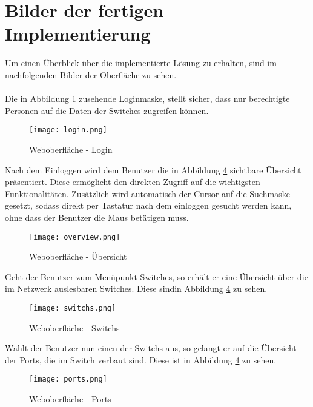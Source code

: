 \section*{Bilder der fertigen Implementierung}
\label{sec:impimgs}

Um einen Überblick über die implementierte Lösung zu erhalten, sind im nachfolgenden Bilder der Oberfläche zu sehen.\\\\
Die in Abbildung \ref{fig:login} zusehende Loginmaske, stellt sicher, dass nur berechtigte Personen auf die Daten der Switches zugreifen können.


\begin{figure}[H]
\centering
\texttt{[image: login.png]}
\caption[]{Weboberfläche - Login}
\label{fig:login}
\end{figure}

Nach dem Einloggen wird dem Benutzer die in Abbildung \ref{fig:overview} sichtbare Übersicht präsentiert.
Diese ermöglicht den direkten Zugriff auf die wichtigsten Funktionalitäten.
Zusätzlich wird automatisch der Cursor auf die Suchmaske gesetzt, sodass direkt per Tastatur nach dem einloggen gesucht werden kann, ohne dass der Benutzer die Maus betätigen muss.

\begin{figure}[H]
\centering
\texttt{[image: overview.png]}
\caption[]{Weboberfläche - Übersicht}
\label{fig:overview}
\end{figure}

Geht der Benutzer zum Menüpunkt Switches, so erhält er eine Übersicht über die im Netzwerk auslesbaren Switches.
Diese sindin Abbildung \ref{fig:overview} zu sehen.

\begin{figure}[H]
\centering
\texttt{[image: switchs.png]}
\caption[]{Weboberfläche - Switchs}
\label{fig:overview}
\end{figure}

Wählt der Benutzer nun einen der Switchs aus, so gelangt er auf die Übersicht der Ports, die im Switch verbaut sind.
Diese ist in Abbildung \ref{fig:overview} zu sehen.

\begin{figure}[H]
\centering
\texttt{[image: ports.png]}
\caption[]{Weboberfläche - Ports}
\label{fig:overview}
\end{figure}

